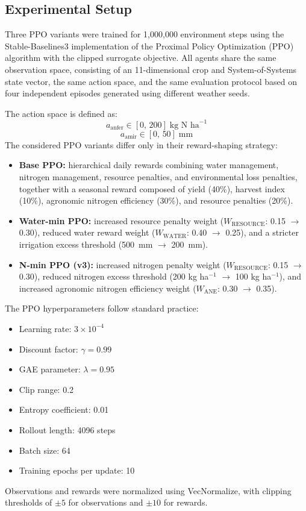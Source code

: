 \subsection{Experimental Setup}

Three PPO variants were trained for 1,000,000 environment steps using the Stable-Baselines3 implementation of the Proximal Policy Optimization (PPO) algorithm with the clipped surrogate objective. All agents share the same observation space, consisting of an 11-dimensional crop and System-of-Systems state vector, the same action space, and the same evaluation protocol based on four independent episodes generated using different weather seeds.

The action space is defined as:
\begin{equation}
a_{\text{anfer}} \in [0,\,200] \;\text{kg N ha}^{-1}
\end{equation}
\begin{equation}
a_{\text{amir}} \in [0,\,50] \;\text{mm}
\end{equation}
The considered PPO variants differ only in their reward-shaping strategy:
\begin{itemize}
  \item \textbf{Base PPO:} hierarchical daily rewards combining water management, nitrogen management, resource penalties, and environmental loss penalties, together with a seasonal reward composed of yield (40\%), harvest index (10\%), agronomic nitrogen efficiency (30\%), and resource penalties (20\%).
  \item \textbf{Water-min PPO:} increased resource penalty weight ($W_{\text{RESOURCE}}$: 0.15 $\to$ 0.30), reduced water reward weight ($W_{\text{WATER}}$: 0.40 $\to$ 0.25), and a stricter irrigation excess threshold (500~mm $\to$ 200~mm).
  \item \textbf{N-min PPO (v3):} increased nitrogen penalty weight ($W_{\text{RESOURCE}}$: 0.15 $\to$ 0.30), reduced nitrogen excess threshold (200 kg ha$^{-1}$ $\to$ 100 kg ha$^{-1}$), and increased agronomic nitrogen efficiency weight ($W_{\text{ANE}}$: 0.30 $\to$ 0.35).
\end{itemize}
The PPO hyperparameters follow standard practice:
\begin{itemize}
  \item Learning rate: $3 \times 10^{-4}$
  \item Discount factor: $\gamma = 0.99$
  \item GAE parameter: $\lambda = 0.95$
  \item Clip range: 0.2
  \item Entropy coefficient: 0.01
  \item Rollout length: 4096 steps
  \item Batch size: 64
  \item Training epochs per update: 10
\end{itemize}
Observations and rewards were normalized using VecNormalize, with clipping thresholds of $\pm 5$ for observations and $\pm 10$ for rewards.


